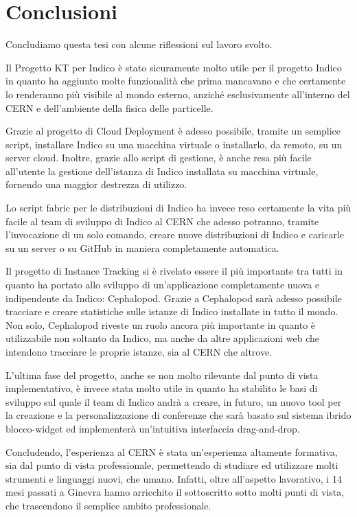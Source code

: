 \chapter{Conclusioni} \label{chap:conclusioni}

    Concludiamo questa tesi con alcune riflessioni sul lavoro svolto.
    
    Il Progetto KT per Indico è stato sicuramente molto utile per il progetto Indico in quanto ha aggiunto molte funzionalità che prima mancavano e che certamente lo renderanno più visibile al mondo esterno, anziché esclusivamente all'interno del \ac{CERN} e dell'ambiente della fisica delle particelle.
    
    Grazie al progetto di Cloud Deployment è adesso possibile, tramite un semplice script, installare Indico su una macchina virtuale o installarlo, da remoto, su un server cloud. Inoltre, grazie allo script di gestione, è anche resa più facile all'utente la gestione dell'istanza di Indico installata su macchina virtuale, fornendo una maggior destrezza di utilizzo.
    
    Lo script fabric per le distribuzioni di Indico ha invece reso certamente la vita più facile al team di sviluppo di Indico al \ac{CERN} che adesso potranno, tramite l'invocazione di un solo comando, creare nuove distribuzioni di Indico e caricarle su un server o su GitHub in maniera completamente automatica.
    
    Il progetto di Instance Tracking si è rivelato essere il più importante tra tutti in quanto ha portato allo sviluppo di un'applicazione completamente nuova e indipendente da Indico: Cephalopod. Grazie a Cephalopod sarà adesso possibile tracciare e creare statistiche sulle istanze di Indico installate in tutto il mondo. Non solo, Cephalopod riveste un ruolo ancora più importante in quanto è utilizzabile non soltanto da Indico, ma anche da altre applicazioni web che intendono tracciare le proprie istanze, sia al \ac{CERN} che altrove.
    
    L'ultima fase del progetto, anche se non molto rilevante dal punto di vista implementativo, è invece stata molto utile in quanto ha stabilito le basi di sviluppo sul quale il team di Indico andrà a creare, in futuro, un nuovo tool per la creazione e la personalizzazione di conferenze che sarà basato sul sistema ibrido blocco-widget ed implementerà un'intuitiva interfaccia drag-and-drop.
    
    Concludendo, l'esperienza al \ac{CERN} è stata un'esperienza altamente formativa, sia dal punto di vista professionale, permettendo di studiare ed utilizzare molti strumenti e linguaggi nuovi, che umano. Infatti, oltre all'aspetto lavorativo, i 14 mesi passati a Ginevra hanno arricchito il sottoscritto sotto molti punti di vista, che trascendono il semplice ambito professionale.
